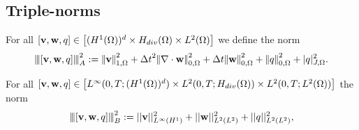 \subsection{Triple-norms}
For all $[{\bf v},{\bf w},q]  \in \left[( H^{1}(\Omega))^d \times H_{div} (\Omega) \times L^2 (\Omega) \right]$ we define the norm
\begin{equation}
\label{eqn:triple_norm}
\triplenorm{[{\bf v},{\bf w},q] }^2
:=\honenorm{{\bf v}}^2 + {\Delta t}^2\ltwonorm{\nabla \cdot {\bf w}}^2 + {\Delta t} \ltwonorm{{\bf w}}^2  + \ltwonorm{q}^2 + \jnorm{q}^2.
\end{equation}

For all $[{\bf v},{\bf w},q]  \in \left[L^{\infty} (0,T; ( H^{1}(\Omega))^d ) \times L^2(0,T;H_{div} (\Omega)) \times L^2(0,T; L^2(\Omega)) \right]$  the norm
\begin{equation}
\label{eqn:triple_norm time}
\triplenormtime{[{\bf v},{\bf w},q] }^2
:=  || {\bf v} ||_{L^{\infty}(H^1)}^2 + || {\bf w} ||_{L^{2}(L^2)}^2 + || q ||_{L^2(L^2)}^2,
\end{equation}


